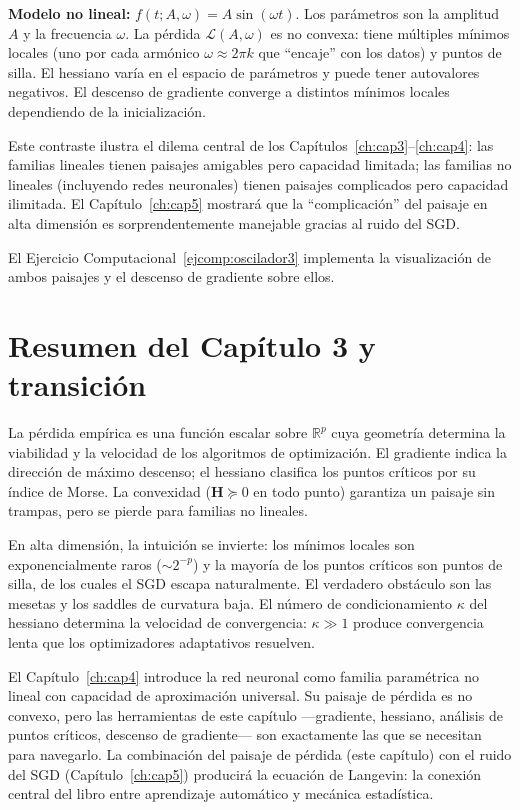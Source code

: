 \textbf{Modelo no lineal:} $f(t;A,\omega) = A\sin(\omega t)$. Los
parámetros son la amplitud $A$ y la frecuencia $\omega$. La pérdida
$\mathcal{L}(A,\omega)$ es no convexa: tiene múltiples mínimos locales
(uno por cada armónico $\omega \approx 2\pi k$ que ``encaje'' con los
datos) y puntos de silla. El hessiano varía en el espacio de parámetros
y puede tener autovalores negativos. El descenso de gradiente converge
a distintos mínimos locales dependiendo de la inicialización.

Este contraste ilustra el dilema central de los Capítulos~\ref{ch:cap3}--\ref{ch:cap4}: las familias lineales tienen paisajes amigables pero
capacidad limitada; las familias no lineales (incluyendo redes neuronales)
tienen paisajes complicados pero capacidad ilimitada. El
Capítulo~\ref{ch:cap5} mostrará que la ``complicación'' del paisaje en
alta dimensión es sorprendentemente manejable gracias al ruido del SGD.

El Ejercicio Computacional~\ref{ejcomp:oscilador3} implementa la
visualización de ambos paisajes y el descenso de gradiente sobre ellos.

\section{Resumen del Capítulo 3 y transición}
\label{sec:resumen3}

La pérdida empírica es una función escalar sobre $\mathbb{R}^p$ cuya
geometría determina la viabilidad y la velocidad de los algoritmos de
optimización. El gradiente indica la dirección de máximo descenso; el
hessiano clasifica los puntos críticos por su índice de Morse. La
convexidad ($\bm{H} \succeq 0$ en todo punto) garantiza un paisaje sin
trampas, pero se pierde para familias no lineales.

En alta dimensión, la intuición se invierte: los mínimos locales son
exponencialmente raros ($\sim 2^{-p}$) y la mayoría de los puntos
críticos son puntos de silla, de los cuales el SGD escapa naturalmente.
El verdadero obstáculo son las mesetas y los saddles de curvatura baja.
El número de condicionamiento $\kappa$ del hessiano determina la
velocidad de convergencia: $\kappa \gg 1$ produce convergencia lenta que
los optimizadores adaptativos resuelven.

El Capítulo~\ref{ch:cap4} introduce la red neuronal como familia
paramétrica no lineal con capacidad de aproximación universal. Su
paisaje de pérdida es no convexo, pero las herramientas de este
capítulo —gradiente, hessiano, análisis de puntos críticos, descenso de
gradiente— son exactamente las que se necesitan para navegarlo. La
combinación del paisaje de pérdida (este capítulo) con el ruido del SGD
(Capítulo~\ref{ch:cap5}) producirá la ecuación de Langevin: la conexión
central del libro entre aprendizaje automático y mecánica estadística.

